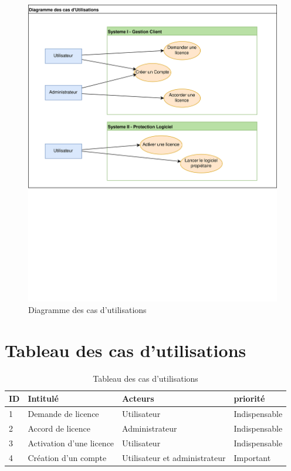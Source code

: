 \begin{figure}[h]
	\centering
	\includegraphics[width=13.5cm]{main/png/Util.png}
	\vspace{-5cm}
	\caption{Diagramme des cas d'utilisations}
	\label{fig:fig2}
\end{figure}

\section{Tableau des cas d'utilisations}

\begin{table}[h]
	\centering
	\begin{tabular}{ | m{0.6cm} | m{6cm} | m{6cm}| m{3cm} | } 
                \hline
		\textbf{ID} & \textbf{Intitulé} & \textbf{Acteurs} & \textbf{priorité} \\
                \hline
			1 & Demande de licence & Utilisateur & Indispensable \\
                \hline
			2 & Accord de licence & Administrateur & Indispensable \\
                \hline
			3 & Activation d'une licence & Utilisateur & Indispensable \\
		\hline
			4 & Création d'un compte & Utilisateur et administrateur & Important \\
		\hline
        \end{tabular}
	\caption{Tableau des cas d'utilisations}
	\label{tab:tab1}
\end{table}
\newpage

